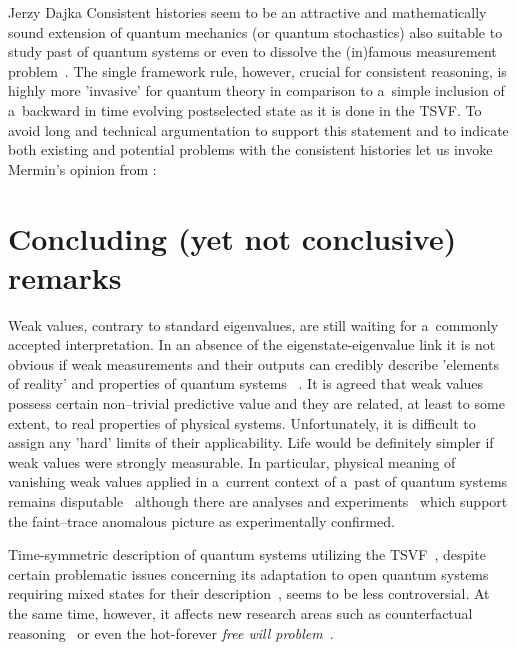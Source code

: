 \begin{artengenv}{Jerzy Dajka}
%
Consistent histories seem to be an attractive and mathematically sound extension of quantum mechanics (or quantum stochastics) also suitable to study past of quantum systems  or even  to dissolve the  (in)famous measurement problem~\parencite{GRIFFITHS_measur,Griffiths_reason}. The single framework rule, however, crucial for consistent reasoning, is highly more 'invasive' for quantum theory in comparison to a~simple inclusion of a~backward in time evolving postselected state as it is done in the TSVF. To avoid long and technical argumentation  to support this statement and to indicate both existing and potential problems with the consistent histories let us invoke Mermin's opinion from   
\parencite*{mermin}:

\section{Concluding (yet not conclusive) remarks}

Weak values, contrary to standard eigenvalues, are still waiting for a~commonly accepted interpretation. In an absence of the eigenstate-eigenvalue link it is not obvious if weak measurements and their outputs can credibly describe 'elements of reality' and properties of quantum systems ~\parencite{Matzkin_prop,vaid_trans}. It is agreed that weak values possess certain non--trivial predictive value and they are related, at least to some extent, to real properties of physical systems. Unfortunately, it is difficult to assign any 'hard' limits of their applicability. Life would be definitely simpler if weak values were strongly measurable. In particular,  
  physical meaning of vanishing weak values applied in  a~current context of a~past of quantum systems  remains disputable~\parencite{PhysRevA.95.032110,PhysRevA.97.046102,PhysRevA.97.046103,weak,lady} although  there are analyses and experiments~\parencite{e20110854,PhysRevA.101.052119,pnas,pnas1} which support the faint--trace anomalous picture as experimentally confirmed.   

Time-symmetric description of quantum systems utilizing the TSVF~\parencite{aharonov_entrop,Aharonov2008}, despite certain problematic issues concerning its adaptation to open quantum systems requiring mixed states for their description~\parencite{weak,scirep},   seems to be less controversial. At the same time, however, it affects new research areas such as counterfactual reasoning~\parencite{kont0}  or even the hot-forever {\it free will problem}~\parencite{wil}. 


\end{artengenv}
